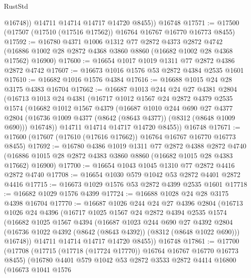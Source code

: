 \begin{lexlean}{RustStd}
\begin{coremodule}
            @16748))
        @14711
        @14714
        @14717
        @14720
        @8455))
    @16748
@17571 := @17500 (@17507 (@17510 (@17516 @17562)) @16764 @16767 @16770 @16773 @8455)
@17592 := @16780
    @4371
    @1006
    @1312
    @77
    @2872
    @4373
    @2872
    @4742
    (@16886 @1002 @28 @2872 @4368 @3860 @8860 (@16682 @1002 @28 @4368 @17562) @16900)
@17600 := @16654 @1017 @1019 @1311 @77 @2872 @4386 @2872 @4742
@17607 := @16673 @1016 @1576 @53 @2872 @4384 @2535 @1601
@17610 := @16682 @1016 @1576 @4384
@17616 := @16688 @1015 @24 @28 @3175 @4383 @16704
@17662 := @16687
    @1013
    @244
    @24
    @27
    @4381
    @2804
    (@16713
      @1013
      @24
      @4381
      (@16717
        @1012
        @1567
        @24
        @2872
        @4379
        @2535
        @1574
        (@16682
          @1012
          @1567
          @4379
          (@16687
            @1010
            @244
            @690
            @27
            @4377
            @2804
            (@16736 @1009 @4377 (@8642 (@8643 @4377)) (@8312 (@8648 @1009 @690)))
            @16748))
        @14711
        @14714
        @14717
        @14720
        @8455))
    @16748
@17671 := @17600 (@17607 (@17610 (@17616 @17662)) @16764 @16767 @16770 @16773 @8455)
@17692 := @16780
    @4386
    @1019
    @1311
    @77
    @2872
    @4388
    @2872
    @4740
    (@16886 @1015 @28 @2872 @4383 @3860 @8860 (@16682 @1015 @28 @4383 @17662) @16900)
@17700 := @16654 @1043 @1045 @1310 @77 @2872 @4416 @2872 @4740
@17708 := @16654 @1030 @579 @1042 @53 @2872 @4401 @2872 @4416
@17715 := @16673 @1029 @1576 @53 @2872 @4399 @2535 @1601
@17718 := @16682 @1029 @1576 @4399
@17724 := @16688 @1028 @24 @28 @3175 @4398 @16704
@17770 := @16687
    @1026
    @244
    @24
    @27
    @4396
    @2804
    (@16713
      @1026
      @24
      @4396
      (@16717
        @1025
        @1567
        @24
        @2872
        @4394
        @2535
        @1574
        (@16682
          @1025
          @1567
          @4394
          (@16687
            @1023
            @244
            @690
            @27
            @4392
            @2804
            (@16736 @1022 @4392 (@8642 (@8643 @4392)) (@8312 (@8648 @1022 @690)))
            @16748))
        @14711
        @14714
        @14717
        @14720
        @8455))
    @16748
@17861 := @17700
    (@17708
      (@17715 (@17718 (@17724 @17770)) @16764 @16767 @16770 @16773 @8455)
      (@16780
        @4401
        @579
        @1042
        @53
        @2872
        @3533
        @2872
        @4414
        @16800
        (@16673
          @1041
          @1576

\end{coremodule}
\end{lexlean}
